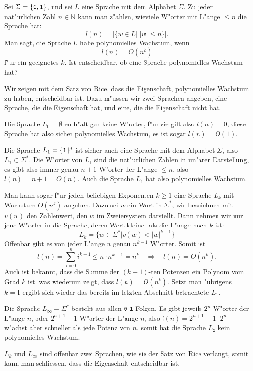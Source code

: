 Sei $\Sigma=\{\text{\tt 0},\text{\tt 1}\}$, und sei $L$ eine Sprache
mit dem Alphabet $\Sigma$. Zu jeder nat"urlichen Zahl $n\in\mathbb N$
kann man z"ahlen, wieviele W"orter mit L"ange $\le n$ die Sprache
hat:
\[
l(n)=|\{w\in L|\;|w|\le n\}|.
\]
Man sagt, die Sprache $L$ habe polynomielles Wachstum, wenn
\[
l(n)=O(n^k)
\]
f"ur ein geeignetes $k$. Ist entscheidbar, ob eine Sprache polynomielles
Wachstum hat?

\begin{loesung}
Wir zeigen mit dem Satz von Rice, dass die Eigenschaft, polynomielles
Wachstum zu haben, entscheidbar ist. Dazu m"ussen wir zwei Sprachen
angeben, eine Sprache, die die Eigenschaft hat, und eine, die die
Eigenschaft nicht hat.

Die Sprache $L_0=\emptyset$ enth"alt gar keine W"orter, f"ur sie
gilt also $l(n)=0$, diese Sprache hat also sicher polynomielles
Wachstum, es ist sogar $l(n)=O(1)$.

Die Sprache $L_1=\{\text{\tt 1}\}^*$ ist sicher auch eine Sprache mit
dem Alphabet $\Sigma$, also $L_1\subset \Sigma^*$. Die W"orter
von $L_1$ sind die nat"urlichen Zahlen in un"arer Darstellung,
es gibt also immer genau $n+1$ W"orter der L"ange $\le n$, also
$l(n)=n+1=O(n)$. Auch die Sprache $L_1$ hat also polynomielles Wachstum.

Man kann sogar f"ur jeden beliebigen Exponenten $k\ge 1$ eine Sprache $L_k$
mit Wachstum $O(n^k)$ angeben. Dazu sei $w$ ein Wort in $\Sigma^*$,
wir bezeichnen mit $v(w)$ den Zahlenwert, den $w$ im Zweiersystem
darstellt. Dann nehmen wir nur jene W"orter in die Sprache,
deren Wert kleiner als die L"ange hoch $k$ ist:
\[
L_k=\{ w\in\Sigma^*| v(w) < |w|^{k-1}\}
\]
Offenbar gibt es von jeder L"ange $n$ genau $n^{k-1}$ W"orter.
Somit ist
\[
l(n)=\sum_{i=0}^ni^{k-1}\le n\cdot n^{k-1}=n^k\quad\Rightarrow\quad l(n)=O(n^k).
\]
Auch ist bekannt, dass die Summe der $(k-1)$-ten Potenzen ein
Polynom vom Grad $k$ ist, was wiederum zeigt, dass $l(n)=O(n^k)$.
Setzt man "ubrigens $k=1$ ergibt
sich wieder das bereits im letzten Abschnitt betrachtete
$L_1$.

Die Sprache $L_\infty=\Sigma^*$ besteht aus allen {\tt 0}-{\tt 1}-Folgen.
Es gibt jeweils $2^n$ W"orter der L"ange $n$, oder $2^{n+1}-1$ W"orter
der L"ange $n$, also $l(n)=2^{n+1}-1$. $2^n$ w"achst aber schneller
als jede Potenz von $n$, somit hat die Sprache $L_2$ kein polynomielles
Wachstum.

$L_k$ und $L_\infty$ sind offenbar zwei Sprachen, wie sie der Satz von
Rice verlangt, somit kann man schliessen, dass die Eigenschaft
entscheidbar ist.
\end{loesung}
